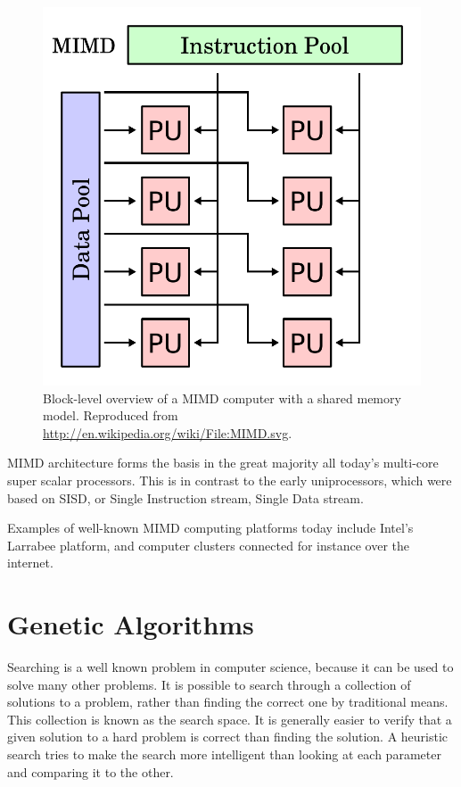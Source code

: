 \begin{figure}[H]
\begin{center}
    \includegraphics[width=\textwidth/2]{fig/mimd-block-diagram.pdf}
    \caption[
    Block-level overview of a MIMD computer with a shared memory model
    ]{Block-level overview of a MIMD computer with a shared memory model. Reproduced from \url{http://en.wikipedia.org/wiki/File:MIMD.svg}.}
    \label{figure:mimd-block-diagram}
\end{center}
\end{figure}


MIMD architecture forms the basis in the great majority all today’s multi-core super scalar processors.
This is in contrast to the early uniprocessors, which were based on SISD, or Single Instruction stream, Single Data stream. 


Examples of well-known MIMD computing platforms today include Intel's Larrabee platform, and computer clusters connected for instance over the internet.

\section{Genetic Algorithms}
\label{ga-algorithms}

Searching is a well known problem in computer science, because it can be used to solve many other problems.
It is possible to search through a collection of solutions to a problem, rather than finding the correct one by traditional means.
This collection is known as the \Gls{search space}.
It is generally easier to verify that a given solution to a hard problem is correct than finding the solution.
A heuristic search tries to make the search more intelligent than looking at each parameter and comparing it to the other.

